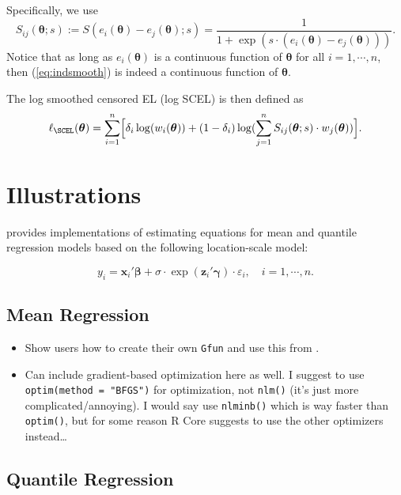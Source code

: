 \documentclass[article]{jss}
\renewcommand{\|}{\,|\,}
\begin{document}
Specifically, we use
\begin{equation}\label{eq:indsmooth}
  S_{ij}(\bm \theta;s) := S(e_i(\bm \theta)-e_j(\bm \theta);s)
  = \frac{1}{1+\exp(s\cdot(e_i(\bm \theta)-e_j(\bm \theta)))}.
\end{equation}
Notice that as long as \(e_i(\bm \theta)\) is a continuous function of \(\bm \theta\) for all \(i=1,\cdots,n\), then (\ref{eq:indsmooth}) is indeed a continuous function of \(\bm \theta\).

The log smoothed censored EL (log SCEL) is then defined as
\begin{equation}\label{eq:logel_smoo}
  \ell_{\SCEL}(\bm \theta) = \sum_{i=1}^n \Bigl[\delta_i\log(w_i(\bm \theta)) +
    (1-\delta_i)\log(\sum_{j=1}^n S_{ij}(\bm \theta;s)\cdot w_j(\bm \theta))\Bigr].
\end{equation}

\hypertarget{illustrations}{%
\section{Illustrations}\label{illustrations}}

 provides implementations of estimating equations for mean and quantile regression models based on the following location-scale model:

\begin{equation} \label{md:lsmod}
  y_i = \bm x_i'\bm \beta+ \sigma\cdot\exp(\bm z_i'\bm \gamma)\cdot\varepsilon_i, \quad i=1,\cdots,n.
\end{equation}

\hypertarget{mean-regression}{%
\subsection{Mean Regression}\label{mean-regression}}

\begin{itemize}
\item
  Show users how to create their own \texttt{Gfun} and use this from .
\item
  Can include gradient-based optimization here as well. I suggest to use \texttt{optim(method\ =\ "BFGS")} for optimization, not \texttt{nlm()} (it's just more complicated/annoying). I would say use \texttt{nlminb()} which is way faster than \texttt{optim()}, but for some reason R Core suggests to use the other optimizers instead\ldots{}
\end{itemize}

\hypertarget{quantile-regression}{%
\subsection{Quantile Regression}\label{quantile-regression}}
\end{document}
